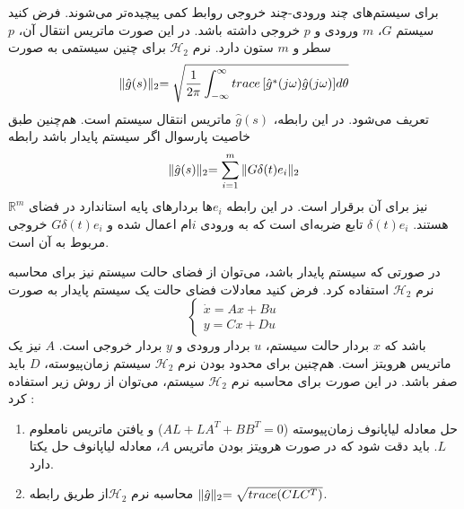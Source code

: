 برای سیستم‌های چند ورودی-چند خروجی روابط کمی پیچیده‌تر می‌شوند. فرض کنید سیستم $G$، $m$ ورودی و $p$ خروجی داشته باشد. در این صورت ماتریس انتقال آن، $p$ سطر و $m$ ستون دارد. نرم $\mathcal{H}_2$ برای چنین سیستمی به صورت
\begin{equation*}
\lVert\hat{g}(s)\lVert_{2}=\sqrt{\dfrac{1}{2\pi}\int_{-\infty}^{\infty}{trace\left[ \hat{g}^{*}(j\omega)\hat{g}(j\omega)\right] }d\theta} 
\end{equation*}
تعریف می‌شود. در این رابطه، $\hat{g}(s)$ ماتریس انتقال سیستم است. هم‌چنین طبق خاصیت پارسوال اگر سیستم پایدار باشد رابطه 
\begin{equation}
\lVert\hat{g}(s)\lVert_{2}=\sum_{i=1}^{m}{\lVert G\delta(t)e_{i}\lVert_{2}} 
\label{eq2-3}
\end{equation}
نیز برای آن برقرار است. در این رابطه $e_{i}$ها بردارهای پایه استاندارد در فضای $\mathbb{R}^{m}$ هستند. $\delta(t)e_{i}$ تابع ضربه‌ای است که به ورودی $i$ام اعمال شده و $G\delta(t)e_{i}$ خروجی مربوط به آن است.

در صورتی که سیستم پایدار باشد، می‌توان از فضای حالت سیستم نیز برای محاسبه نرم $\mathcal{H}_2$ استفاده کرد.  فرض کنید معادلات فضای حالت یک سیستم پایدار به صورت 
\begin{equation*}
\left\{\begin{array}{l}
\dot{x}=Ax +Bu\\
y =Cx+Du 
\end{array}\right. 
\end{equation*}
باشد که $x$ بردار حالت سیستم، $u$ بردار ورودی و $y$ بردار خروجی است. $A$ نیز یک ماتریس هرویتز است. هم‌چنین برای محدود بودن نرم $\mathcal{H}_2$ سیستم زمان‌پیوسته، $D$ باید صفر باشد. در این صورت برای محاسبه نرم $\mathcal{H}_2$ سیستم، می‌توان از روش زیر استفاده کرد \cite{book_1}: 
\begin{enumerate}
\item
حل معادله لیاپانوف زمان‌پیوسته ($AL+LA^{T}+BB^{T}=0$) و یافتن ماتریس نامعلوم $L$.
\newline
باید دقت شود که در صورت هرویتز بودن ماتریس $A$، معادله لیاپانوف حل یکتا دارد.
\item
محاسبه نرم  $\mathcal{H}_2$از طریق رابطه $\lVert\hat{g}\lVert_{2}=\sqrt{trace(CLC^{T})}$.
\end{enumerate}

